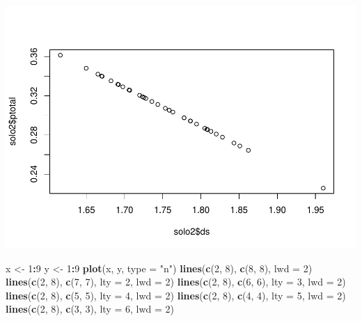 \documentclass[
]{book}
\newenvironment{Shaded}{\begin{snugshade}}{\end{snugshade}}
\newcommand{\DataTypeTok}[1]{\textcolor[rgb]{0.13,0.29,0.53}{#1}}
\newcommand{\DecValTok}[1]{\textcolor[rgb]{0.00,0.00,0.81}{#1}}
\newcommand{\KeywordTok}[1]{\textcolor[rgb]{0.13,0.29,0.53}{\textbf{#1}}}
\newcommand{\NormalTok}[1]{#1}
\newcommand{\OperatorTok}[1]{\textcolor[rgb]{0.81,0.36,0.00}{\textbf{#1}}}
\newcommand{\StringTok}[1]{\textcolor[rgb]{0.31,0.60,0.02}{#1}}
\begin{document}
\includegraphics{TudodoR_files/figure-latex/unnamed-chunk-158-2.pdf}

\begin{Shaded}
\begin{Highlighting}[]
\NormalTok{x <-}\StringTok{ }\DecValTok{1}\OperatorTok{:}\DecValTok{9}
\NormalTok{y <-}\StringTok{ }\DecValTok{1}\OperatorTok{:}\DecValTok{9}
  \KeywordTok{plot}\NormalTok{(x, y, }\DataTypeTok{type =} \StringTok{"n"}\NormalTok{)}
    \KeywordTok{lines}\NormalTok{(}\KeywordTok{c}\NormalTok{(}\DecValTok{2}\NormalTok{, }\DecValTok{8}\NormalTok{), }\KeywordTok{c}\NormalTok{(}\DecValTok{8}\NormalTok{, }\DecValTok{8}\NormalTok{), }\DataTypeTok{lwd =} \DecValTok{2}\NormalTok{)}
    \KeywordTok{lines}\NormalTok{(}\KeywordTok{c}\NormalTok{(}\DecValTok{2}\NormalTok{, }\DecValTok{8}\NormalTok{), }\KeywordTok{c}\NormalTok{(}\DecValTok{7}\NormalTok{, }\DecValTok{7}\NormalTok{), }\DataTypeTok{lty =} \DecValTok{2}\NormalTok{, }\DataTypeTok{lwd =} \DecValTok{2}\NormalTok{)}
    \KeywordTok{lines}\NormalTok{(}\KeywordTok{c}\NormalTok{(}\DecValTok{2}\NormalTok{, }\DecValTok{8}\NormalTok{), }\KeywordTok{c}\NormalTok{(}\DecValTok{6}\NormalTok{, }\DecValTok{6}\NormalTok{), }\DataTypeTok{lty =} \DecValTok{3}\NormalTok{, }\DataTypeTok{lwd =} \DecValTok{2}\NormalTok{)}
    \KeywordTok{lines}\NormalTok{(}\KeywordTok{c}\NormalTok{(}\DecValTok{2}\NormalTok{, }\DecValTok{8}\NormalTok{), }\KeywordTok{c}\NormalTok{(}\DecValTok{5}\NormalTok{, }\DecValTok{5}\NormalTok{), }\DataTypeTok{lty =} \DecValTok{4}\NormalTok{, }\DataTypeTok{lwd =} \DecValTok{2}\NormalTok{)}
    \KeywordTok{lines}\NormalTok{(}\KeywordTok{c}\NormalTok{(}\DecValTok{2}\NormalTok{, }\DecValTok{8}\NormalTok{), }\KeywordTok{c}\NormalTok{(}\DecValTok{4}\NormalTok{, }\DecValTok{4}\NormalTok{), }\DataTypeTok{lty =} \DecValTok{5}\NormalTok{, }\DataTypeTok{lwd =} \DecValTok{2}\NormalTok{)}
    \KeywordTok{lines}\NormalTok{(}\KeywordTok{c}\NormalTok{(}\DecValTok{2}\NormalTok{, }\DecValTok{8}\NormalTok{), }\KeywordTok{c}\NormalTok{(}\DecValTok{3}\NormalTok{, }\DecValTok{3}\NormalTok{), }\DataTypeTok{lty =} \DecValTok{6}\NormalTok{, }\DataTypeTok{lwd =} \DecValTok{2}\NormalTok{)}
\end{Highlighting}
\end{Shaded}
\end{document}
